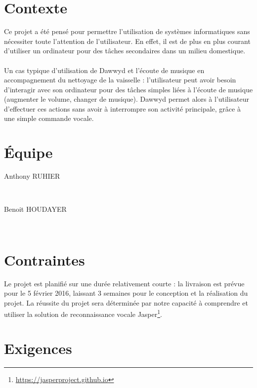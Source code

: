 \documentclass[12pt]{article}
\begin{document}
    \section{Contexte}

Ce projet a été pensé pour permettre l'utilisation de systèmes informatiques 
sans nécessiter toute l'attention de l'utilisateur. En effet, il est de plus en
plus courant d'utiliser un ordinateur pour des tâches secondaires dans un
milieu domestique.

\paragraph{}
Un cas typique d'utilisation de Dawwyd et l'écoute de musique
en accompagnement du nettoyage de la vaisselle : l'utilisateur peut avoir
besoin d'interagir avec son ordinateur pour des tâches simples liées à l'écoute
de musique (augmenter le volume, changer de musique).
Dawwyd permet alors à l'utilisateur d'effectuer ces actions sans avoir à
interrompre son activité principale, grâce à une simple commande vocale.

    \section{Équipe}

\begin{description}
    \item[Anthony RUHIER] \hfill \\
    \item[Benoit HOUDAYER] \hfill \\

\end{description}

    \section{Contraintes}

Le projet est planifié sur une durée relativement courte : la livraison
est prévue pour le 5 février 2016, laissant 3 semaines pour le conception et la
réalisation du projet. La réussite du projet sera déterminée par notre capacité
à comprendre et utiliser la solution de reconnaissance vocale
Jasper\footnote{\url{https://jasperproject.github.io}}.

    \section{Exigences}
\end{document}
